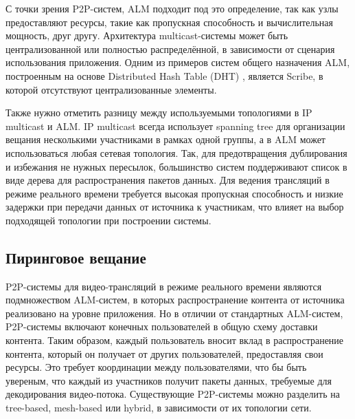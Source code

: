		С точки зрения P2P-систем, ALM подходит под это определение, так как узлы предоставляют ресурсы, такие как
		пропускная способность и вычислительная мощность, друг другу. Архитектура multicast-системы может быть
		централизованной или полностью распределённой, в зависимости от сценария использования приложения. Одним из
		примеров систем общего назначения ALM, построенным на основе Distributed Hash Table (DHT) \cite{6763343}, является Scribe, в
		которой отсутствуют централизованные элементы.

		Также нужно отметить разницу между используемыми топологиями в IP multicast и ALM. IP multicast всегда
		использует spanning tree для организации вещания несколькими участниками в рамках одной группы, а в ALM
		может использоваться любая сетевая топология. Так, для предотвращения дублирования и избежания не нужных
		пересылок, большинство систем поддерживают список в виде дерева для распространения пакетов данных. Для ведения
		трансляций в режиме реального времени требуется высокая пропускная способность и низкие задержки при передачи
		данных от источника к участникам, что влияет на выбор подходящей топологии при построении системы.

	\subsection{Пиринговое вещание}
	P2P-системы для видео-трансляций в режиме реального времени являются подмножеством ALM-систем, в которых
	распространение контента от источника реализовано на уровне приложения. Но в отличии от стандартных ALM-систем,
	P2P-системы включают конечных пользователей в общую схему доставки контента. Таким образом, каждый пользователь
	вносит вклад в распространение контента, который он получает от других пользователей, предоставляя свои ресурсы.
	Это требует координации между пользователями, что бы быть увереным, что каждый из участников получит пакеты данных,
	требуемые для декодирования видео-потока. Существующие P2P-системы можно разделить на tree-based,
	mesh-based или hybrid, в зависимости от их топологии сети.

